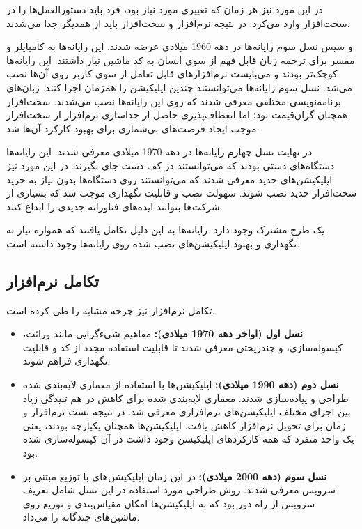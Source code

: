 در این مورد نیز هر زمان که تغییری مورد نیاز بود، فرد باید دستورالعمل‌ها را در سخت‌افزار وارد می‌کرد. در نتیجه نرم‌افزار و سخت‌افزار باید از همدیگر جدا می‌شدند.

و سپس نسل سوم رایانه‌ها در دهه 1960 میلادی عرضه شدند. این رایانه‌ها به کامپایلر و مفسر برای ترجمه زبان قابل فهم از سوی انسان به کد ماشین نیاز داشتند. این رایانه‌ها کوچک‌تر بودند و می‌بایست نرم‌افزارهای قابل تعامل از سوی کاربر روی آن‌ها نصب می‌شد. نسل سوم رایانه‌ها می‌توانستند چندین اپلیکیشن را همزمان اجرا کنند. زبان‌های برنامه‌نویسی مختلفی معرفی شدند که روی این رایانه‌ها نصب می‌شدند. سخت‌افزار همچنان گران‌قیمت بود؛ اما انعطاف‌پذیری حاصل از جداسازی نرم‌افزار از سخت‌افزار موجب ایجاد فرصت‌های بی‌شماری برای بهبود کارکرد آن‌ها شد.

در نهایت نسل چهارم رایانه‌ها در دهه 1970 میلادی معرفی شدند. این رایانه‌ها دستگاه‌های دستی بودند که می‌توانستند در کف دست جای بگیرند. در این مورد نیز اپلیکیشن‌های جدید معرفی شدند که می‌توانستند روی دستگاه‌ها بدون نیاز به خرید سخت‌افزار جدید نصب شوند. سهولت نصب و قابلیت نگهداری موجب شد که بسیاری از شرکت‌ها بتوانند ایده‌های فناورانه جدیدی را ابداع کنند.

یک طرح مشترک وجود دارد. رایانه‌ها به این دلیل تکامل یافتند که همواره نیاز به نگهداری و بهبود اپلیکیشن‌های نصب شده روی رایانه‌ها وجود داشته است.
\cite{malik2020}

\subsection{تکامل نرم‌افزار}
تکامل نرم‌افزار نیز چرخه مشابه را طی کرده است.
\begin{itemize}

\item
\textbf{
نسل اول (اواخر دهه 1970 میلادی):
}
مفاهیم شیءگرایی مانند وراثت، کپسوله‌سازی، و چندریختی معرفی شدند تا قابلیت استفاده مجدد از کد و قابلیت نگهداری فراهم شوند.

\item
\textbf{
نسل دوم (دهه 1990 میلادی):
}
اپلیکیشن‌ها با استفاده از معماری لایه‌بندی شده طراحی و پیاده‌سازی شدند. معماری لایه‌بندی شده برای کاهش در هم تنیدگی زیاد بین اجزای مختلف اپلیکیشن‌های نرم‌افزاری معرفی شد. در نتیجه تست نرم‌افزار و زمان برای تحویل نرم‌افزار کاهش یافت. اپلیکیشن‌ها همچنان یکپارچه بودند، یعنی یک واحد منفرد که همه کارکردهای اپلیکیشن وجود داشت در آن کپسوله‌سازی شده بود.

\item
\textbf{
نسل سوم (دهه 2000 میلادی):
}
در این زمان اپلیکیشن‌های با توزیع مبتنی بر سرویس معرفی شدند. روش طراحی مورد استفاده در این نسل شامل تعریف سرویس از راه دور بود که به اپلیکیشن‌ها امکان مقیاس‌بندی و توزیع روی ماشین‌های چندگانه را می‌داد.
\cite{malik2020}

\end{itemize}

